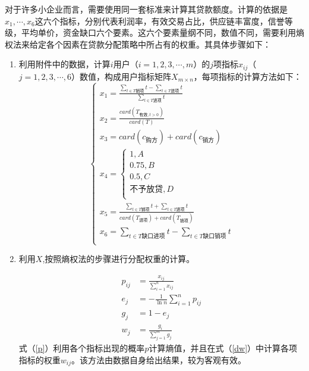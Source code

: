 \documentclass{my_paper}
\begin{document}
对于许多小企业而言，需要使用同一套标准来计算其贷款额度。计算的依据是$x_1,\cdots,x_6$这六个指标，分别代表利润率，有效交易占比，供应链丰富度，信誉等级，平均单价，资金缺口六个要素。这六个要素量纲不同，数值不同，需要利用熵权法来给定各个因素在贷款分配策略中所占有的权重。其具体步骤如下：
\begin{enumerate}
    \item 利用附件中的数据，计算$i$用户（$i=1,2,3,\cdots,m$）的$j$项指标$x_{ij}$（$j=1,2,3,\cdots,6$）数值，构成用户指标矩阵$X_{m\times n}$，每项指标的计算方法如下：
    $$\begin{cases}
        x_1 = \frac{\sum\limits_{t\in T\text{销项}}t-\sum\limits_{t\in T\text{进项}}t}{\sum\limits_{t\in T\text{进项}}t}\\
        x_2 = \frac{card(T_{\text{有效},t>0})}{card(T)}
            \\
            x_3 = card(c_{\text{购方}})+card(c_{\text{销方}})
        \\x_4 = \begin{cases}
            1,A\\
            0.75,B\\
            0.5,C\\
            \text{不予放贷},D\\
        \end{cases}\\
        x_5 = \frac{\sum\limits_{t\in T\text{销项}}t+\sum\limits_{t\in T\text{进项}}t}{card(T_{\text{进项}})+card(T_{\text{销项}})}
        \\
        x_6 =\sum\limits_{t\in T\text{缺口进项}}t-\sum\limits_{t\in T\text{缺口销项}}t
\\
    \end{cases}$$

    \item 利用$X$,按照熵权法的步骤进行分配权重的计算。
    
   
    \begin{align}
    p_{ij} &= \frac{x_{ij}}{\sum\limits^n_{i=1}x_{ij}}\\
    \label{p}
    e_j &= -\frac{1}{\ln n}\sum\limits^n_{i=1}p_{ij}\\
    \label{ej}
    g_j &= 1-e_j\\
    w_j &= \frac{g_i}{\sum\limits^m_{j=1}g_j}
    \label{dw}
    \end{align}
    式（\ref{p}）利用各个指标出现的概率$p$计算熵值，并且在式（\ref{dw}）中计算各项指标的权重$w_{ij}$。该方法由数据自身给出结果，较为客观有效。


\end{enumerate}
\end{document}

